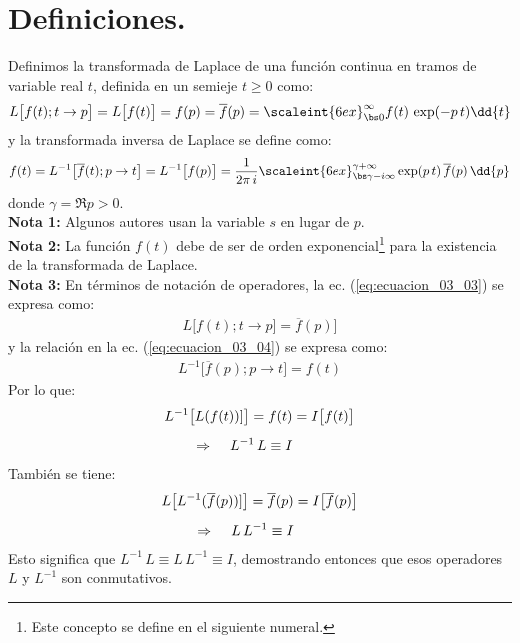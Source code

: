\section{Definiciones.}

Definimos la transformada de Laplace de una función continua en tramos de variable real $t$, definida en un semieje $t \geq 0$ como:
\begin{align}
L \big[ f (t); t \to p \big] = L \big[ f (t) \big] = f (p) = \overline{f}(p) = \scaleint{6ex}_{\bs 0}^{\infty} f (t) \, \exp(-p \, t) \dd{t}
\label{eq:ecuacion_03_03}
\end{align}
y la transformada inversa de Laplace se define como:
\begin{align}
f (t) = L^{-1} \big[ \overline{f}(t); p \to t \big] = L^{-1} \big[ f (p) \big] = \dfrac{1}{2 \pi \, i} \scaleint{6ex}_{\bs \gamma-i \infty}^{\gamma+\infty} \exp(p \, t) \, \overline{f} (p) \, \dd{p}
\label{eq:ecuacion_03_04}
\end{align}
donde $\gamma = \Re{p} > 0$.
\\[1em]
\noindent \textbf{Nota 1: } Algunos autores usan la variable $s$ en lugar de $p$.
\\
\textbf{Nota 2: } La función $f (t)$ debe de ser de orden exponencial\footnote{Este concepto se define en el siguiente numeral.} para la existencia de la transformada de Laplace.
\\
\textbf{Nota 3: } En términos de notación de operadores, la ec. (\ref{eq:ecuacion_03_03}) se expresa como:
\begin{align}
L \big[  f (t); t \to p] = \overline{f} (p)  \big]
\label{eq:ecuacion_03_05}
\end{align}
y la relación en la ec. (\ref{eq:ecuacion_03_04}) se expresa como:
\begin{align}
L^{-1} \big[ \overline{f}(p); p \to t  \big] = f (t)
\label{eq:ecuacion_03_06}
\end{align}
Por lo que:
\begin{align*}
L^{-1} \big[ L(f (t))] \big] = f (t) &= I \big[ f (t) \big] \\[0.5em]
\Rightarrow \hspace{0.4cm} L^{-1} \, L \equiv I
\end{align*}
También se tiene:
\begin{align*}
L \big[ L^{-1} (\overline{f}(p))] \big] = \overline{f}(p) &= I \big[ \overline{f}(p) \big] \\[0.5em]
\Rightarrow \hspace{0.4cm} L \, L^{-1} \equiv I
\end{align*}
Esto significa que $L^{-1} \, L \equiv L \, L^{-1} \equiv I$, demostrando entonces que esos operadores $L$ y $L^{-1}$ son conmutativos.

